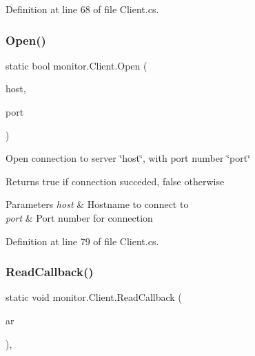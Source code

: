 Definition at line 68 of file Client.\+cs.

\mbox{\label{classmonitor_1_1_client_aee6f8f594a9496600b78c37d6da457d4}} 
\subsubsection{Open()\hspace{0.1cm}{\footnotesize\ttfamily [2/2]}}
{\footnotesize\ttfamily static bool monitor.\+Client.\+Open (\begin{DoxyParamCaption}\item[{string}]{host,  }\item[{int}]{port }\end{DoxyParamCaption})\hspace{0.3cm}{\ttfamily [static]}}



Open connection to server \char`\"{}host\char`\"{}, with port number \char`\"{}port\char`\"{} 

\begin{DoxyReturn}{Returns}
true if connection succeded, false otherwise
\end{DoxyReturn}

\begin{DoxyParams}{Parameters}
{\em host} & Hostname to connect to\\
\hline
{\em port} & Port number for connection\\
\hline
\end{DoxyParams}


Definition at line 79 of file Client.\+cs.

\mbox{\label{classmonitor_1_1_client_a8dd2eb26c164d0f566dd6c679ba340e0}} 
\subsubsection{Read\+Callback()}
{\footnotesize\ttfamily static void monitor.\+Client.\+Read\+Callback (\begin{DoxyParamCaption}\item[{I\+Async\+Result}]{ar }\end{DoxyParamCaption})\hspace{0.3cm}{\ttfamily [static]}, {\ttfamily [private]}}



